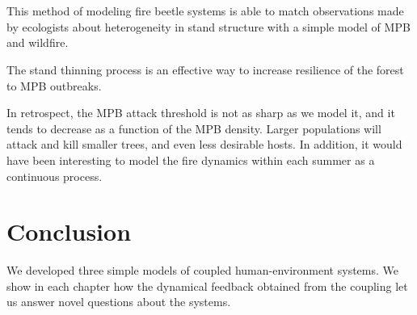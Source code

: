 \documentclass{article}
\begin{document}
\section{}


This method of modeling fire beetle systems is able to match observations made by ecologists about heterogeneity in stand structure with a simple model of MPB and wildfire. 

The stand thinning process is an effective way to increase resilience of the forest to MPB outbreaks. 

In retrospect, the MPB attack threshold is not as sharp as we model it, and it tends to decrease as a function of the MPB density. Larger populations will attack and kill smaller trees, and even less desirable hosts. In addition, it would have been interesting to model the fire dynamics within each summer as a continuous process.  
\section{Conclusion} 

We developed three simple models of coupled human-environment systems. We show in each chapter how the dynamical feedback obtained from the coupling let us answer novel questions about the systems.
\section{}
\end{document}
